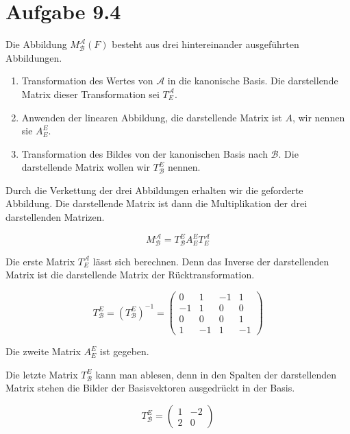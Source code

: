 \documentclass[a4paper,german,12pt,smallheadings]{scrartcl}
\begin{document}
\section*{Aufgabe 9.4}
Die Abbildung $M^{\mathcal{A}}_{\mathcal{B}}(F)$ besteht aus drei
hintereinander ausgeführten Abbildungen.

\begin{enumerate}
  \item Transformation des Wertes von $\mathcal{A}$ in die kanonische Basis. Die darstellende Matrix dieser Transformation sei $T^{\mathcal{A}}_E$.
  \item Anwenden der linearen Abbildung, die darstellende Matrix ist $A$, wir nennen sie $A^E_E$.
  \item Transformation des Bildes von der kanonischen Basis nach $\mathcal{B}$. Die darstellende Matrix wollen wir $T^{E}_{\mathcal{B}}$ nennen.
\end{enumerate}

Durch die Verkettung der drei Abbildungen erhalten wir die
geforderte Abbildung. Die darstellende Matrix ist dann die Multiplikation der
drei darstellenden Matrizen.

\begin{equation}
  M^{\mathcal{A}}_{\mathcal{B}} = T^{E}_{\mathcal{B}} A^E_E T^{\mathcal{A}}_E 
\end{equation}

Die erste Matrix $T^{\mathcal{A}}_E$ lässt sich berechnen. Denn das Inverse der
darstellenden Matrix ist die darstellende Matrix der Rücktransformation.

\begin{equation}
  T^{E}_{\mathcal{B}} = (T^{E}_{\mathcal{B}})^{-1} = \begin{pmatrix} 0 & 1 & -1 & 1 \\ -1 & 1 & 0 & 0 \\ 0 & 0 & 0 & 1 \\ 1 & -1 & 1 & -1 \end{pmatrix}
\end{equation}

Die zweite Matrix $A^E_E$ ist gegeben.

Die letzte Matrix $T^{E}_{\mathcal{B}}$ kann man ablesen, denn in
den Spalten der darstellenden Matrix stehen die Bilder der Basisvektoren
ausgedrückt in der Basis.

\begin{equation}
  T^{E}_{\mathcal{B}} = \begin{pmatrix} 1 & -2 \\ 2 & 0 \end{pmatrix}
\end{equation}
\end{document}
